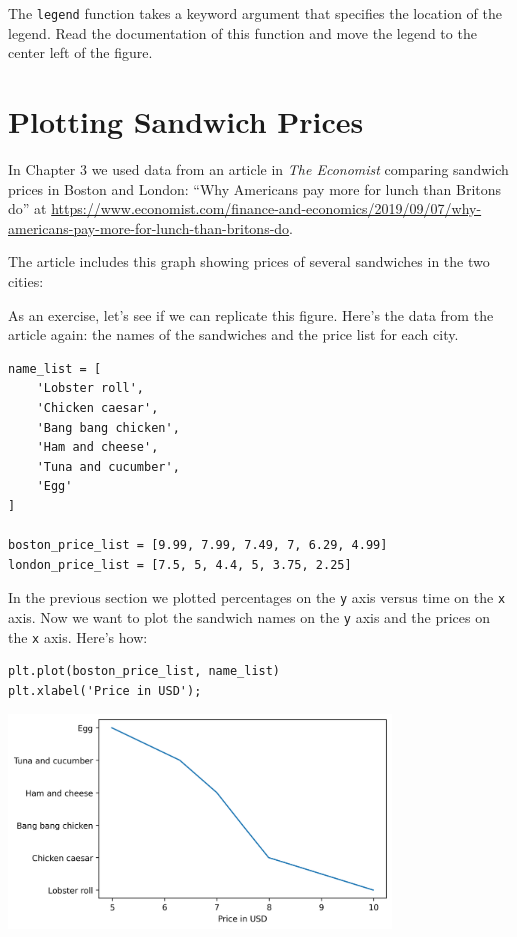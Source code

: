 The \passthrough{\lstinline!legend!} function takes a keyword argument
that specifies the location of the legend. Read the documentation of
this function and move the legend to the center left of the figure.

\hypertarget{plotting-sandwich-prices}{%
\section{Plotting Sandwich Prices}\label{plotting-sandwich-prices}}

In Chapter 3 we used data from an article in \emph{The Economist}
comparing sandwich prices in Boston and London: ``Why Americans pay more
for lunch than Britons do'' at
\url{https://www.economist.com/finance-and-economics/2019/09/07/why-americans-pay-more-for-lunch-than-britons-do}.

The article includes this graph showing prices of several sandwiches in
the two cities:

As an exercise, let's see if we can replicate this figure. Here's the
data from the article again: the names of the sandwiches and the price
list for each city.

\begin{lstlisting}[]
name_list = [
    'Lobster roll',
    'Chicken caesar',
    'Bang bang chicken',
    'Ham and cheese',
    'Tuna and cucumber',
    'Egg'
]

boston_price_list = [9.99, 7.99, 7.49, 7, 6.29, 4.99]
london_price_list = [7.5, 5, 4.4, 5, 3.75, 2.25]
\end{lstlisting}

In the previous section we plotted percentages on the
\passthrough{\lstinline!y!} axis versus time on the
\passthrough{\lstinline!x!} axis. Now we want to plot the sandwich names
on the \passthrough{\lstinline!y!} axis and the prices on the
\passthrough{\lstinline!x!} axis. Here's how:

\begin{lstlisting}[]
plt.plot(boston_price_list, name_list)
plt.xlabel('Price in USD');
\end{lstlisting}

\begin{center}
\includegraphics[width=4in]{chapters/06_plotting_files/06_plotting_38_0.png}
\end{center}

